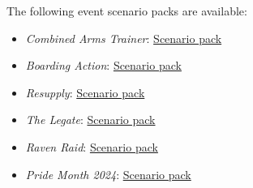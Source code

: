 The following event scenario packs are available:

\begin{itemize}

\item \emph{Combined Arms Trainer}: \href{https://raw.githubusercontent.com/Eudicods/outworlds-wastes/rules-pdf/combined-arms-trainer.pdf}{Scenario pack}

\item \emph{Boarding Action}: \href{https://raw.githubusercontent.com/Eudicods/outworlds-wastes/rules-pdf/boarding-action.pdf}{Scenario pack}

\item \emph{Resupply}: \href{https://raw.githubusercontent.com/Eudicods/outworlds-wastes/rules-pdf/resupply.pdf}{Scenario pack}

\item \emph{The Legate}: \href{https://raw.githubusercontent.com/Eudicods/outworlds-wastes/rules-pdf/the-legate.pdf}{Scenario pack}

\item \emph{Raven Raid}: \href{https://raw.githubusercontent.com/Eudicods/outworlds-wastes/rules-pdf/raven-raid.pdf}{Scenario pack}

\item \emph{Pride Month 2024}: \href{https://raw.githubusercontent.com/Eudicods/outworlds-wastes/rules-pdf/pride-2024.pdf}{Scenario pack}

\end{itemize}
